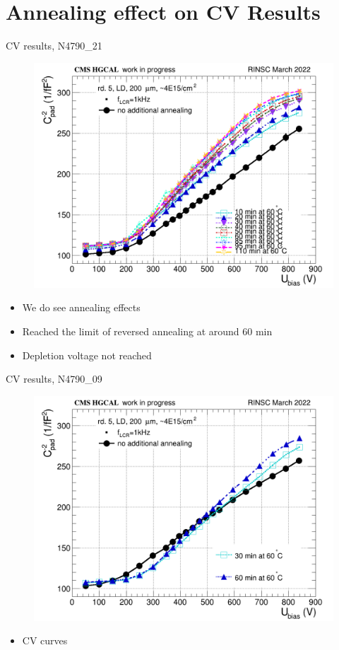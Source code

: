 \documentclass{beamer}
\begin{document}
\section{Annealing effect on CV Results}

\begin{frame}{CV results, N4790\_21}
  \begin{figure}
      \includegraphics[width=.6\textwidth]{plots/annealing_CV_ch101_N4790_21.png}    
  \end{figure}
  \begin{itemize}
    \item We do see annealing effects
    \item Reached the limit of reversed annealing at around \alert{60 min}
    \item  Depletion voltage not reached 
  \end{itemize}
\end{frame}

\begin{frame}{CV results, N4790\_09}
  \begin{figure}
      \includegraphics[width=.7\textwidth]{plots/annealing_CV_ch101_N4790_09.png}    
  \end{figure}
  \begin{itemize}
    \item CV curves
  \end{itemize}
\end{frame}
\end{document}
